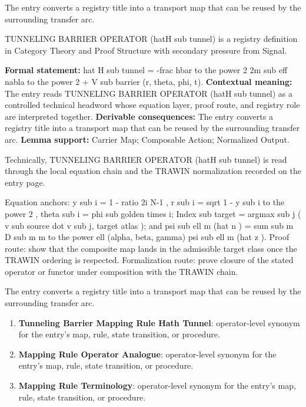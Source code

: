 The entry converts a registry title into a transport map that can be reused by the surrounding transfer arc.
\clearpage


\begingroup\small
{}
TUNNELING BARRIER OPERATOR (hatH sub tunnel) is a registry definition in Category Theory and Proof Structure with secondary pressure from Signal.

\begingroup\footnotesize\setlength{\emergencystretch}{3em}\sloppy
\textbf{Formal statement:} hat H sub tunnel = -frac hbar to the power 2 2m sub eff nabla to the power 2 + V sub barrier (r, theta, phi, t). \textbf{Contextual meaning:} The entry reads TUNNELING BARRIER OPERATOR (hatH sub tunnel) as a controlled technical headword whose equation layer, proof route, and registry role are interpreted together. \textbf{Derivable consequences:} The entry converts a registry title into a transport map that can be reused by the surrounding transfer arc. \textbf{Lemma support:} Carrier Map; Composable Action; Normalized Output.\par
\endgroup

Technically, TUNNELING BARRIER OPERATOR (hatH sub tunnel) is read through the local equation chain and the TRAWIN normalization recorded on the entry page.

Equation anchors: y sub i = 1 - ratio 2i N-1 , r sub i = sqrt 1 - y sub i to the power 2 , theta sub i = phi sub golden times i; Index sub target = argmax sub j ( v sub source dot v sub j, target atlas ); and psi sub ell m (hat n ) = sum sub m D sub m m to the power ell (alpha, beta, gamma) psi sub ell m (hat z ). Proof route: show that the composite map lands in the admissible target class once the TRAWIN ordering is respected. Formalization route: prove closure of the stated operator or functor under composition with the TRAWIN chain.

The entry converts a registry title into a transport map that can be reused by the surrounding transfer arc.
\endgroup

\begin{enumerate}[leftmargin=1.6em,itemsep=6pt,topsep=4pt]
\item \textbf{Tunneling Barrier Mapping Rule Hath Tunnel}: operator-level synonym for the entry's map, rule, state transition, or procedure.
\item \textbf{Mapping Rule Operator Analogue}: operator-level synonym for the entry's map, rule, state transition, or procedure.
\item \textbf{Mapping Rule Terminology}: operator-level synonym for the entry's map, rule, state transition, or procedure.
\end{enumerate}


